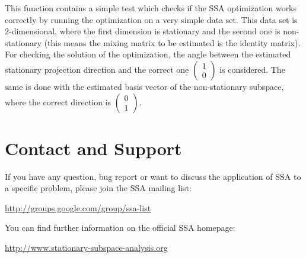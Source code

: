 \documentclass{article}
\newcommand{\1}{\ensuremath{\mathds{1}}}
\newcommand{\0}{\ensuremath{0}}
\begin{document}
This function contains a simple test which checks
if the SSA optimization works correctly by running the optimization on a very simple data set. This data set is $2$-dimensional, where
the first dimension is stationary and the second one is non-stationary (this means the mixing matrix to be estimated is the identity matrix).
For checking the solution of the optimization, the angle between the estimated stationary projection direction and the correct one
$\begin{pmatrix} 1 \\ 0\end{pmatrix}$ is considered. The same is done with the estimated basis vector of the non-stationary subspace,
where the correct direction is $\begin{pmatrix} 0 \\ 1\end{pmatrix}$.


\section{Contact and Support}

If you have any question, bug report or want to discuss the application of SSA
to a specific problem, please join the SSA mailing list:
\begin{center}
        \url{http://groups.google.com/group/ssa-list}
\end{center}
You can find further
information on the official SSA homepage: 
\begin{center}
	\url{http://www.stationary-subspace-analysis.org}
\end{center}

\newpage
\end{document}
